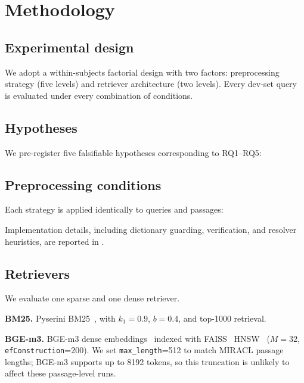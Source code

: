 \section{Methodology}
\label{sec:method}

\subsection{Experimental design}

We adopt a within-subjects factorial design with two factors: preprocessing strategy (five levels) and retriever architecture (two levels). Every dev-set query is evaluated under every combination of conditions.

\subsection{Hypotheses}

We pre-register five falsifiable hypotheses corresponding to RQ1--RQ5:



\subsection{Preprocessing conditions}

Each strategy is applied identically to queries and passages:



Implementation details, including dictionary guarding, verification, and resolver heuristics, are reported in .

\subsection{Retrievers}

We evaluate one sparse and one dense retriever.

\smallskip
\noindent\textbf{BM25.} Pyserini BM25~\cite{lin2021pyserini}, with $k_1 = 0.9$, $b = 0.4$, and top-1000 retrieval.

\smallskip
\noindent\textbf{BGE-m3.} BGE-m3 dense embeddings~\cite{chen2024bgem3} indexed with FAISS~\cite{douze2024faiss} HNSW~\cite{malkov2020hnsw} ($M=32$, \texttt{efConstruction}=200). We set \texttt{max\_length}=512 to match MIRACL passage lengths; BGE-m3 supports up to 8192 tokens, so this truncation is unlikely to affect these passage-level runs.

